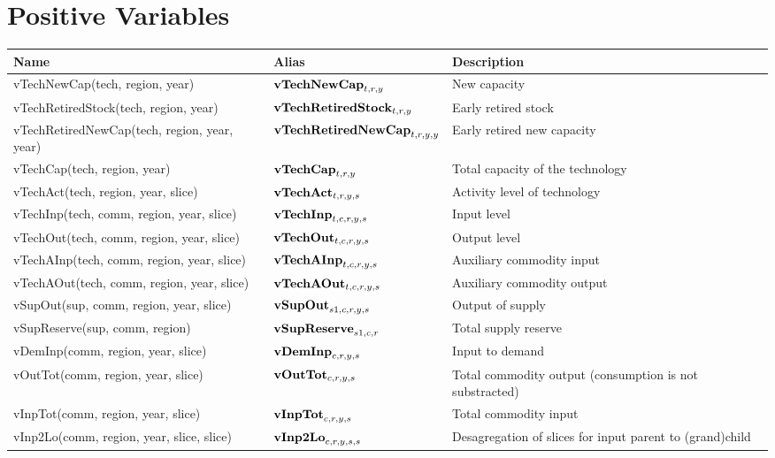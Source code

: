\documentclass{article}
\begin{document}
\section*{Positive Variables}
\begin{longtable}{|p{10cm}|p{5cm}|p{9cm}|}
\hline
\bf{Name} & \bf{Alias}   & \bf{Description} \\ 
 \hline
vTechNewCap(tech, region, year) & ${\bf vTechNewCap}_{t,r,y}$ & New capacity \\ 
 \hline
vTechRetiredStock(tech, region, year) & ${\bf vTechRetiredStock}_{t,r,y}$ & Early retired stock \\ 
 \hline
vTechRetiredNewCap(tech, region, year, year) & ${\bf vTechRetiredNewCap}_{t,r,y,y}$ & Early retired new capacity \\ 
 \hline
vTechCap(tech, region, year) & ${\bf vTechCap}_{t,r,y}$ & Total capacity of the technology \\ 
 \hline
vTechAct(tech, region, year, slice) & ${\bf vTechAct}_{t,r,y,s}$ & Activity level of technology \\ 
 \hline
vTechInp(tech, comm, region, year, slice) & ${\bf vTechInp}_{t,c,r,y,s}$ & Input level \\ 
 \hline
vTechOut(tech, comm, region, year, slice) & ${\bf vTechOut}_{t,c,r,y,s}$ & Output level \\ 
 \hline
vTechAInp(tech, comm, region, year, slice) & ${\bf vTechAInp}_{t,c,r,y,s}$ & Auxiliary commodity input \\ 
 \hline
vTechAOut(tech, comm, region, year, slice) & ${\bf vTechAOut}_{t,c,r,y,s}$ & Auxiliary commodity output \\ 
 \hline
vSupOut(sup, comm, region, year, slice) & ${\bf vSupOut}_{s1,c,r,y,s}$ & Output of supply \\ 
 \hline
vSupReserve(sup, comm, region) & ${\bf vSupReserve}_{s1,c,r}$ & Total supply reserve \\ 
 \hline
vDemInp(comm, region, year, slice) & ${\bf vDemInp}_{c,r,y,s}$ & Input to demand \\ 
 \hline
vOutTot(comm, region, year, slice) & ${\bf vOutTot}_{c,r,y,s}$ & Total commodity output (consumption is not substracted) \\ 
 \hline
vInpTot(comm, region, year, slice) & ${\bf vInpTot}_{c,r,y,s}$ & Total commodity input \\ 
 \hline
vInp2Lo(comm, region, year, slice, slice) & ${\bf vInp2Lo}_{c,r,y,s,s}$ & Desagregation of slices for input parent to (grand)child \\ 
 \hline

\end{longtable}
\end{document}
